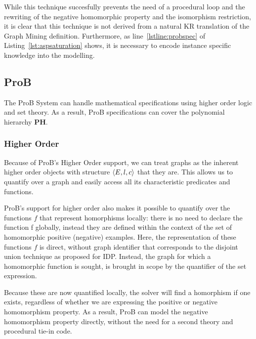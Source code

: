 While this technique succesfully prevents the need of a procedural loop and the rewriting of the negative homomorphic property and the isomorphism restriction, it is clear that this technique is not derived from a natural KR translation of the Graph Mining definition.
Furthermore, as line~\ref{lstline:probspec} of Listing~\ref{lst:aspsaturation} shows, it is necessary to encode instance specific knowledge into the modelling.


\subsection{ProB}
The ProB System can handle mathematical specifications using higher order logic and set theory.
As a result, ProB specifications can cover the polynomial hierarchy \textbf{PH}.

\subsubsection{Higher Order}
Because of ProB's Higher Order support, we can treat graphs as the inherent higher order objects with structure $\langle E,l,c \rangle$ that they are.
This allows us to quantify over a graph and easily access all its characteristic predicates and functions.

ProB's support for higher order also makes it possible to quantify over the functions $f$ that represent homorphisms locally: there is no need to declare the function f globally, instead they are defined within the context of the set of homomorphic positive (negative) examples.
Here, the representation of these functions $f$ is direct, without graph identifier that corresponds to the disjoint union technique as proposed for IDP.
Instead, the graph  for which a homomorphic function is sought, is brought in scope by the quantifier of the set expression.

Because these are now quantified locally, the solver will find a homorphism if one exists, regardless of whether we are expressing the positive or negative homomorphism property.
As a result, ProB can model the negative homomorphism property directly, without the need for a second theory and procedural tie-in code.


